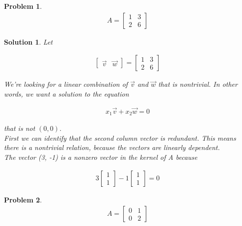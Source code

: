 \documentclass{article}
\newtheorem{problem}{Problem}
\newtheorem*{solution}{Solution}
\begin{document}
\begin{problem}
\begin{align*}
A = \begin{bmatrix}1 & 3 \\ 2 & 6 \end{bmatrix}
\end{align*}
\end{problem}

\begin{solution}
Let

\begin{align*}
\begin{bmatrix}\vec{v} & \vec{w} \end{bmatrix} = \begin{bmatrix}1 & 3 \\ 2 & 6 \end{bmatrix}
\end{align*}

We're looking for a linear combination of $\vec{v}$ and $\vec{w}$ that is nontrivial. In other words, we want a solution to the equation

\begin{align*}
x_{1} \vec{v} + x_{2} \vec{w} = 0
\end{align*}

that is not $(0, 0)$. \\

First we can identify that the second column vector is redundant. This means there is a nontrivial relation, because the vectors are linearly dependent. \\

The vector (3, -1) is a nonzero vector in the kernel of A because 

\begin{align*}
3 \begin{bmatrix} 1 \\ 1 \end{bmatrix} - 1\begin{bmatrix} 1 \\ 1\end{bmatrix} = 0
\end{align*}

\end{solution}

\begin{problem}
\begin{align*}
A = \begin{bmatrix}0 & 1 \\ 0 & 2 \end{bmatrix}
\end{align*}
\end{problem}
\end{document}
